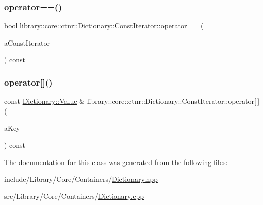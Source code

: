 \subsubsection{\texorpdfstring{operator==()}{operator==()}}
{\footnotesize\ttfamily bool library\+::core\+::ctnr\+::\+Dictionary\+::\+Const\+Iterator\+::operator== (\begin{DoxyParamCaption}\item[{const \mbox{\hyperlink{classlibrary_1_1core_1_1ctnr_1_1_dictionary_1_1_const_iterator}{Const\+Iterator}} \&}]{a\+Const\+Iterator }\end{DoxyParamCaption}) const}

\mbox{\label{classlibrary_1_1core_1_1ctnr_1_1_dictionary_1_1_const_iterator_acb217265236b572c9a94a707ae8d4976}} 
\subsubsection{\texorpdfstring{operator[]()}{operator[]()}}
{\footnotesize\ttfamily const \mbox{\hyperlink{classlibrary_1_1core_1_1ctnr_1_1_dictionary_a3baf6692694e4fc27cb399ac083c88ea}{Dictionary\+::\+Value}} \& library\+::core\+::ctnr\+::\+Dictionary\+::\+Const\+Iterator\+::operator\mbox{[}$\,$\mbox{]} (\begin{DoxyParamCaption}\item[{const \mbox{\hyperlink{classlibrary_1_1core_1_1ctnr_1_1_dictionary_a987cae687cce70d81a2a483c5e05e842}{Dictionary\+::\+Key}} \&}]{a\+Key }\end{DoxyParamCaption}) const}



The documentation for this class was generated from the following files\+:\begin{DoxyCompactItemize}
\item 
include/\+Library/\+Core/\+Containers/\mbox{\hyperlink{_dictionary_8hpp}{Dictionary.\+hpp}}\item 
src/\+Library/\+Core/\+Containers/\mbox{\hyperlink{_dictionary_8cpp}{Dictionary.\+cpp}}\end{DoxyCompactItemize}
